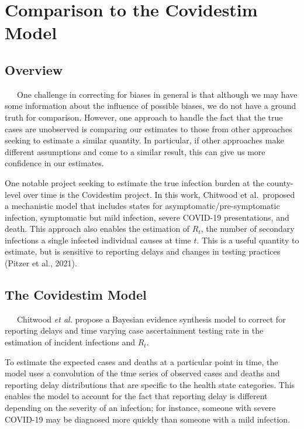 \documentclass[12pt,twoside]{smiththesis}
\begin{document}
\hypertarget{comparison-to-the-covidestim-model}{%
\chapter{Comparison to the Covidestim Model}\label{comparison-to-the-covidestim-model}}

\hypertarget{overview-3}{%
\section{Overview}\label{overview-3}}

~~~One challenge in correcting for biases in general is that although we may have some information about the influence of possible biases, we do not have a ground truth for comparison. However, one approach to handle the fact that the true cases are unobserved is comparing our estimates to those from other approaches seeking to estimate a similar quantity. In particular, if other approaches make different assumptions and come to a similar result, this can give us more confidence in our estimates.

One notable project seeking to estimate the true infection burden at the county-level over time is the Covidestim project. In this work, Chitwood et al.~proposed a mechanistic model that includes states for asymptomatic/pre-symptomatic infection, symptomatic but mild infection, severe COVID-19 presentations, and death. This approach also enables the estimation of \(R_t\), the number of secondary infections a single infected individual causes at time \(t\). This is a useful quantity to estimate, but is sensitive to reporting delays and changes in testing practices (Pitzer et al., 2021).

\hypertarget{the-covidestim-model}{%
\section{The Covidestim Model}\label{the-covidestim-model}}

~~~Chitwood \emph{et al.} propose a Bayesian evidence synthesis model to correct for reporting delays and time varying case ascertainment testing rate in the estimation of incident infections and \(R_t\).

To estimate the expected cases and deaths at a particular point in time, the model uses a convolution of the time series of observed cases and deaths and reporting delay distributions that are specific to the health state categories. This enables the model to account for the fact that reporting delay is different depending on the severity of an infection; for instance, someone with severe COVID-19 may be diagnosed more quickly than someone with a mild infection.
\end{document}
